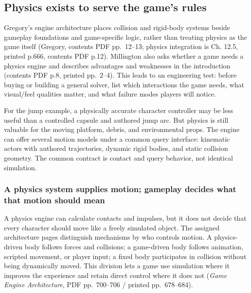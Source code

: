 \subsection{Physics exists to serve the game's rules}\label{06-engine-ii-ch033-physics-exists-to-serve-the-games-rules}

Gregory's engine architecture places collision and rigid-body systems beside gameplay foundations and game-specific logic, rather than treating physics as the game itself (Gregory, contents PDF pp.~12--13; physics integration is Ch. 12.5, printed p.666, contents PDF p.12). Millington also asks whether a game needs a physics engine and describes advantages and weaknesses in the introduction (contents PDF p.8, printed pp.~2--4). This leads to an engineering test: before buying or building a general solver, list which interactions the game needs, what visual/feel qualities matter, and what failure modes players will notice.

For the jump example, a physically accurate character controller may be less useful than a controlled capsule and authored jump arc. But physics is still valuable for the moving platform, debris, and environmental props. The engine can offer several motion models under a common query interface: kinematic actors with authored trajectories, dynamic rigid bodies, and static collision geometry. The common contract is contact and query behavior, not identical simulation.

\subsubsection{A physics system supplies motion; gameplay decides what that motion should mean}\label{06-engine-ii-ch033-a-physics-system-supplies-motion-gameplay-decides-what-that-motion-should-mean}

A physics engine can calculate contacts and impulses, but it does not decide that every character should move like a freely simulated object. The assigned architecture pages distinguish mechanisms by who controls motion. A physics-driven body follows forces and collisions; a game-driven body follows animation, scripted movement, or player input; a fixed body participates in collision without being dynamically moved. This division lets a game use simulation where it improves the experience and retain direct control where it does not (\emph{Game Engine Architecture}, PDF pp.~700--706 / printed pp.~678--684).


